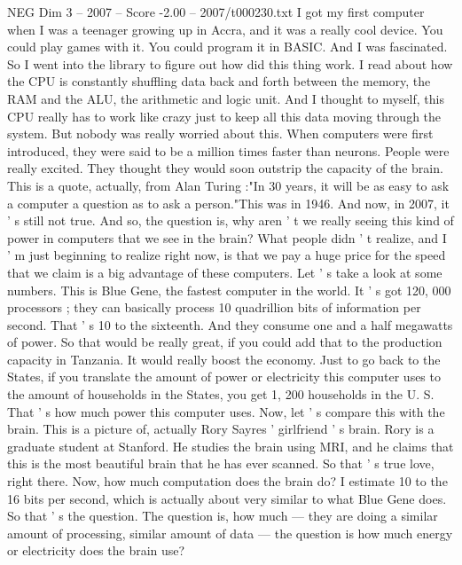 \begin{textsample}{NEG Dim 3 – 2007 – Score -2.00 – 2007/t000230.txt}  \label{ex:f3_neg_040}
I got my first computer when I was a teenager growing up in Accra, and it was a really cool device.
You could play games with it.
You could program it in BASIC.
And I was fascinated.
So I went into the library to figure out how did this thing work.
I read about how the CPU is constantly shuffling data back and forth between the memory, the RAM and the ALU, the arithmetic and logic unit.
And I thought to myself, this CPU really has to work like crazy just to keep all this data moving through the system.
But nobody was really worried about this.
When computers were first introduced, they were said to be a million times faster than neurons.
People were really excited.
They thought they would soon outstrip the capacity of the brain.
This is a quote, actually, from Alan Turing :"In 30 years, it will be as easy to ask a computer a question as to ask a person."This was in 1946.
And now, in 2007, it ' s still not true.
And so, the question is, why aren ' t we really seeing this kind of power in computers that we see in the brain?
What people didn ' t realize, and I ' m just beginning to realize right now, is that we pay a huge price for the speed that we claim is a big advantage of these computers.
Let ' s take a look at some numbers.
This is Blue Gene, the fastest computer in the world.
It ' s got 120, 000 processors ; they can basically process 10 quadrillion bits of information per second.
That ' s 10 to the sixteenth.
And they consume one and a half megawatts of power.
So that would be really great, if you could add that to the production capacity in Tanzania.
It would really boost the economy.
Just to go back to the States, if you translate the amount of power or electricity this computer uses to the amount of households in the States, you get 1, 200 households in the U.
S.
That ' s how much power this computer uses.
Now, let ' s compare this with the brain.
This is a picture of, actually Rory Sayres ' girlfriend ' s brain.
Rory is a graduate student at Stanford.
He studies the brain using MRI, and he claims that this is the most beautiful brain that he has ever scanned.
So that ' s true love, right there.
Now, how much computation does the brain do?
I estimate 10 to the 16 bits per second, which is actually about very similar to what Blue Gene does.
So that ' s the question.
The question is, how much — they are doing a similar amount of processing, similar amount of data — the question is how much energy or electricity does the brain use?

\end{textsample}
